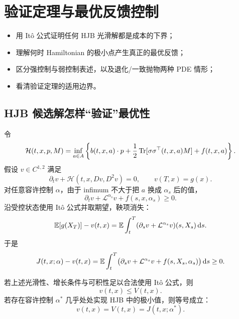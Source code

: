 \chapter{验证定理与最优反馈控制}
\begin{learninggoals}
\begin{itemize}
  \item 用 Itô 公式证明任何 HJB 光滑解都是成本的下界；
  \item 理解何时 Hamiltonian 的极小点产生真正的最优反馈；
  \item 区分强控制与弱控制表述，以及退化/一致抛物两种 PDE 情形；
  \item 看清验证定理的适用边界。
\end{itemize}
\end{learninggoals}

\section{HJB 候选解怎样“验证”最优性}

令
\[
\mathcal H(t,x,p,M)
=\inf_{a\in A}\left\{
b(t,x,a)\cdot p
+\frac12\operatorname{Tr}[\sigma\sigma^\top(t,x,a)M]
+f(t,x,a)\right\}.
\]
假设 $v\in C^{1,2}$ 满足
\[
\partial_tv+\mathcal H(t,x,Dv,D^2v)=0,
\qquad v(T,x)=g(x).
\]
对任意容许控制 $\alpha$，由于 infimum 不大于把 $a$ 换成 $\alpha_s$ 后的值，
\[
\partial_tv+\mathcal L^{\alpha_s}v+f(s,x,\alpha_s)\ge0.
\]
沿受控状态使用 Itô 公式并取期望，鞅项消失：
\[
\mathbb{E}[g(X_T)]-v(t,x)
=\mathbb{E}\int_t^T(\partial_sv+\mathcal L^{\alpha_s}v)(s,X_s)\,\mathrm{d} s.
\]
于是
\[
J(t,x;\alpha)-v(t,x)
=\mathbb{E}\int_t^T
\bigl(\partial_sv+\mathcal L^{\alpha_s}v+f(s,X_s,\alpha_s)\bigr)\,\mathrm{d} s
\ge0.
\]

\begin{theorem}[经典验证定理]
若上述光滑性、增长条件与可积性足以合法使用 Itô 公式，则
\[
v(t,x)\le V(t,x).
\]
若存在容许控制 $\alpha^*$ 几乎处处实现 HJB 中的极小值，则等号成立：
\[
v(t,x)=V(t,x)=J(t,x;\alpha^*).
\]
\end{theorem}

\begin{center}
\end{center}

